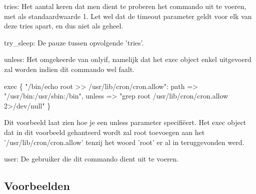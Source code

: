 		tries:
		Het aantal keren dat men dient te proberen het commando uit te voeren, met als standaardwaarde 1.
		Let wel dat de timeout parameter geldt voor elk van deze tries apart, en dus niet als geheel.

		try\_sleep:
		De pauze tussen opvolgende 'tries'.

		unless:
		Het omgekeerde van onlyif, namelijk dat het exec object enkel uitgevoerd zal worden indien dit commando wel faalt.

			exec \{ "/bin/echo root >> /usr/lib/cron/cron.allow":
				path => "/usr/bin:/usr/sbin:/bin",
				unless => "grep root /usr/lib/cron/cron.allow 2>/dev/null"
			\}

		Dit voorbeeld laat zien hoe je een unless parameter specifi\"{e}ert.
		Het exec object dat in dit voorbeeld gehanteerd wordt zal root toevoegen aan het '/usr/lib/cron/cron.allow' tenzij het woord 'root' er al in teruggevonden werd.

		user:
		De gebruiker die dit commando dient uit te voeren.

\subsection{Voorbeelden}
